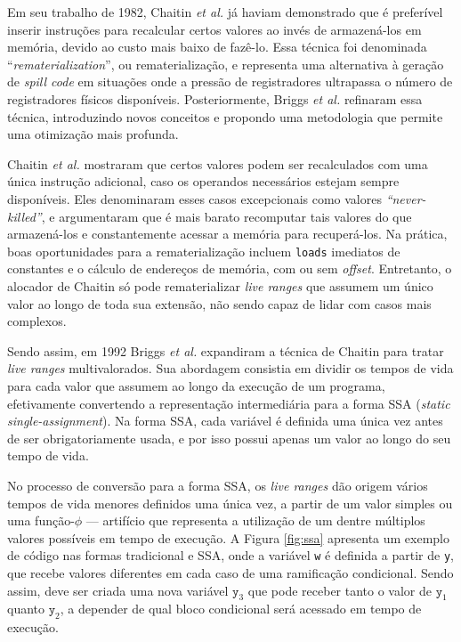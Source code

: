 \documentclass[
	12pt,				%
	openright,			%
	twoside,			%
	a4paper,			%
	tcc,			%
	]{ABNT-DC-UEL}
\begin{document}
Em seu trabalho de 1982, Chaitin \textit{et al.} \cite{chaitin:82} já haviam demonstrado que é preferível inserir instruções para recalcular certos valores ao invés de armazená-los em memória, devido ao custo mais baixo de fazê-lo. Essa técnica foi denominada ``\textit{rematerialization}'', ou rematerialização, e representa uma alternativa à geração de \textit{spill code} em situações onde a pressão de registradores ultrapassa o número de registradores físicos disponíveis. Posteriormente, Briggs \textit{et al.} \cite{briggs2:92} refinaram essa técnica, introduzindo novos conceitos e propondo uma metodologia que permite uma otimização mais profunda.

Chaitin \textit{et al.} mostraram que certos valores podem ser recalculados com uma única instrução adicional, caso os operandos necessários estejam sempre disponíveis. Eles denominaram esses casos excepcionais como valores \textit{``never-killed''}, e argumentaram que é mais barato recomputar tais valores do que armazená-los e constantemente acessar a memória para recuperá-los. Na prática, boas oportunidades para a rematerialização incluem \texttt{loads} imediatos de constantes e o cálculo de endereços de memória, com ou sem \textit{offset}. Entretanto, o alocador de Chaitin só pode rematerializar \textit{live ranges} que assumem um único valor ao longo de toda sua extensão, não sendo capaz de lidar com casos mais complexos.

Sendo assim, em 1992 Briggs \textit{et al.} \cite{briggs2:92} expandiram a técnica de Chaitin para tratar \textit{live ranges} multivalorados. Sua abordagem consistia em dividir os tempos de vida para cada valor que assumem ao longo da execução de um programa, efetivamente convertendo a representação intermediária para a forma SSA (\textit{static single-assignment}). Na forma SSA, cada variável é definida uma única vez antes de ser obrigatoriamente usada, e por isso possui apenas um valor ao longo do seu tempo de vida. 

No processo de conversão para a forma SSA, os \textit{live ranges} dão origem vários tempos de vida menores definidos uma única vez, a partir de um valor simples ou uma função-$\phi$ --- artifício que representa a utilização de um dentre múltiplos valores possíveis em tempo de execução. A Figura \ref{fig:ssa} apresenta um exemplo de código nas formas tradicional e SSA, onde a variável \texttt{w} é definida a partir de \texttt{y}, que recebe valores diferentes em cada caso de uma ramificação condicional. Sendo assim, deve ser criada uma nova variável $\texttt{y}_3$ que pode receber tanto o valor de $\texttt{y}_1$ quanto $\texttt{y}_2$, a depender de qual bloco condicional será acessado em tempo de execução.
\end{document}
